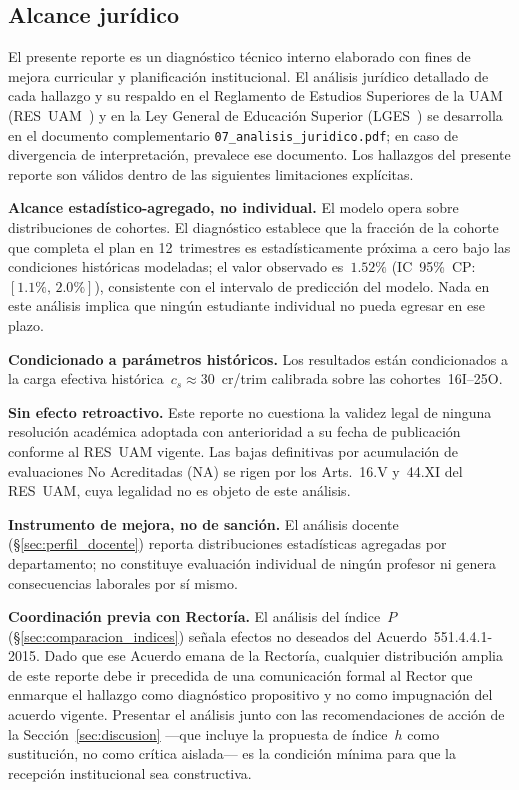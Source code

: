 \documentclass[11pt,letterpaper]{article}
\begin{document}
\subsection{Alcance jurídico}
\label{sec:alcance_juridico}

El presente reporte es un diagnóstico técnico interno elaborado con fines de
mejora curricular y planificación institucional.
El análisis jurídico detallado de cada hallazgo y su respaldo en el Reglamento
de Estudios Superiores de la UAM (RES~UAM~\cite{RESUAM}) y en la Ley General de
Educación Superior (LGES~\cite{LGES2021}) se desarrolla en el documento
complementario \texttt{07\_analisis\_juridico.pdf}; en caso de divergencia de
interpretación, prevalece ese documento.
Los hallazgos del presente reporte son válidos dentro de las siguientes
limitaciones explícitas.

\textbf{Alcance estadístico-agregado, no individual.}
El modelo opera sobre distribuciones de cohortes.
El diagnóstico establece que la fracción de la cohorte que completa el plan en
12~trimestres es estadísticamente próxima a cero bajo las condiciones históricas
modeladas; el valor observado es~$1.52\%$
(IC~95\%~CP: $[1.1\%,\,2.0\%]$), consistente con el intervalo de predicción
del modelo.
Nada en este análisis implica que ningún estudiante individual no pueda egresar en
ese plazo.

\textbf{Condicionado a parámetros históricos.}
Los resultados están condicionados a la carga efectiva histórica~$c_s
\approx 30$~cr/trim calibrada sobre las cohortes~16I--25O.

\textbf{Sin efecto retroactivo.}
Este reporte no cuestiona la validez legal de ninguna resolución académica
adoptada con anterioridad a su fecha de publicación conforme al RES~UAM vigente.
Las bajas definitivas por acumulación de evaluaciones No Acreditadas (NA) se
rigen por los Arts.~16.V y~44.XI del RES~UAM, cuya legalidad no es objeto de
este análisis.

\textbf{Instrumento de mejora, no de sanción.}
El análisis docente (\S\ref{sec:perfil_docente}) reporta distribuciones estadísticas
agregadas por departamento; no constituye evaluación individual de ningún profesor
ni genera consecuencias laborales por sí mismo.

\textbf{Coordinación previa con Rectoría.}
El análisis del índice~$P$ (\S\ref{sec:comparacion_indices}) señala efectos no
deseados del Acuerdo~551.4.4.1-2015.
Dado que ese Acuerdo emana de la Rectoría, cualquier distribución amplia de este
reporte debe ir precedida de una comunicación formal al Rector que enmarque el
hallazgo como diagnóstico propositivo y no como impugnación del acuerdo vigente.
Presentar el análisis junto con las recomendaciones de acción de la
Sección~\ref{sec:discusion} ---que incluye la propuesta de índice~$h$ como
sustitución, no como crítica aislada--- es la condición mínima para que la
recepción institucional sea constructiva.
\end{document}
